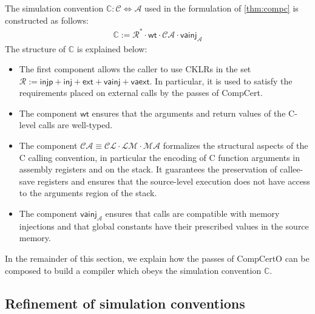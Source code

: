 \documentclass[sigplan,10pt,review]{acmart}
\newcommand{\kw}[1]{\ensuremath{ \mathsf{#1} }}
\begin{document}
The simulation convention
$\mathbb{C} : \mathcal{C} \Leftrightarrow \mathcal{A}$
used in the formulation of \autoref{thm:compc}
is constructed as follows:
\[
  \begin{array}{c}
  \mathbb{C} :=
    \mathcal{R}^* \cdot
    \kw{wt} \cdot
    \mathcal{C}\!\mathcal{A} \cdot
    \kw{vainj}_{\!\mathcal{A}}
  \end{array}
\]
The structure of $\mathbb{C}$
is explained below:
\begin{itemize}
\item
The first component
allows the caller to 
use CKLRs in the set
$
  \mathcal{R} := \kw{injp} + \kw{inj} + \kw{ext} + \kw{vainj} + \kw{vaext}
$.
In particular,
it is used to satisfy the requirements
placed on external calls by the passes of CompCert.
\item
The component \kw{wt}
ensures that the arguments and return values of the C-level calls are well-typed.
\item
The component
$\mathcal{C\!A} \equiv \mathcal{C\!L} \cdot \mathcal{L\!M} \cdot \mathcal{M\!A}$
formalizes the structural aspects of
the C calling convention,
in particular
the encoding of C function arguments
in assembly registers and on the stack.
It guarantees the preservation of
callee-save registers
and ensures that the source-level execution
does not have access to the arguments region
of the stack.
\item
The component
$\kw{vainj}_{\!\mathcal{A}}$
ensures that calls are compatible with memory injections
and that global constants have their prescribed values
in the source memory.
\end{itemize}

In the remainder of this section,
we explain how the passes of CompCertO
can be composed to build a compiler
which obeys the simulation convention $\mathbb{C}$.


\subsection{Refinement of simulation conventions} \label{sec:scref} %
\end{document}
